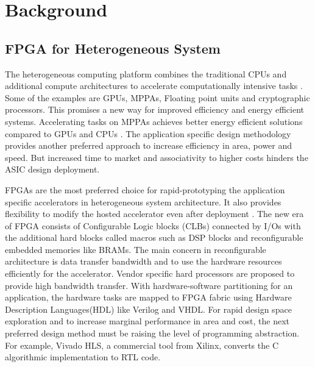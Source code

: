 \chapter{Background}
\label{ch2_background}

\section{FPGA for Heterogeneous System}
The heterogeneous computing platform combines the traditional CPUs and additional compute architectures to accelerate computationally intensive tasks \cite{2}. Some of the examples are GPUs, MPPAs, Floating point units and cryptographic processors. This promises a new way for improved efficiency and energy efficient systems. Accelerating tasks on MPPAs achieves better energy efficient solutions compared to GPUs and CPUs \cite{3}\cite{4}\cite{5}\cite{6}. The application specific design methodology provides another preferred approach to increase efficiency in area, power and speed. But increased time to market and associativity to higher costs hinders the ASIC design deployment.

FPGAs are the most preferred choice for rapid-prototyping the application specific accelerators in heterogeneous system architecture. It also provides flexibility to modify the hosted accelerator even after deployment \cite{7}\cite{8}\cite{9}. The new era of FPGA consists of Configurable Logic blocks (CLBs) connected by I/Os with the additional hard blocks called macros such as DSP blocks and reconfigurable embedded memories like BRAMs. The main concern in reconfigurable architecture is data transfer bandwidth and to use the hardware resources efficiently for the accelerator. Vendor specific hard processors are proposed \cite{10} to provide high bandwidth transfer. With hardware-software partitioning for an application, the hardware tasks are mapped to FPGA fabric using Hardware Description Languages(HDL) like Verilog and VHDL. For rapid design space exploration and to increase marginal performance in area and cost, the next preferred design method must be raising the level of programming abstraction. For example, Vivado HLS, a commercial tool from Xilinx, converts the C algorithmic implementation to RTL code.  

